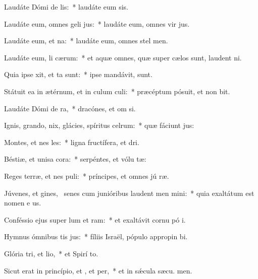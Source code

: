 \item Laudáte Dómi de lis:~* laudáte eum  sis.
\item Laudáte eum, omnes geli jus:~* laudáte eum, omnes vir jus.
\item Laudáte eum,  et na:~* laudáte eum, omnes stel  men.
\item Laudáte eum, li cærum:~* et aquæ omnes, quæ super cælos sunt, laudent  ni.
\item Quia ipse xit, et ta sunt:~* ipse mandávit,   sunt.
\item Státuit ea in ætérnum, et in culum culi:~* præcéptum pósuit, et non bit.
\item Laudáte Dómi de ra,~* dracónes, et om si.
\item Ignis, grando, nix, glácies, spíritus celrum:~* quæ fáciunt  jus:
\item Montes, et nes les:~* ligna fructífera, et  dri.
\item Béstiæ, et unisa cora:~* serpéntes, et vólu tæ:
\item Reges terræ, et nes puli:~* príncipes, et omnes jú ræ.
\item Júvenes, et gines,~\pscross{} senes cum junióribus laudent men mini:~* quia exaltátum est nomen e us.
\item Conféssio ejus super lum et ram:~* et exaltávit cornu pó i.
\item Hymnus ómnibus tis jus:~* fíliis Israël, pópulo appropin bi.
\item Glória tri, et lio,~* et Spirí to.
\item Sicut erat in princípio, et , et per,~* et in sǽcula sæcu. men.
